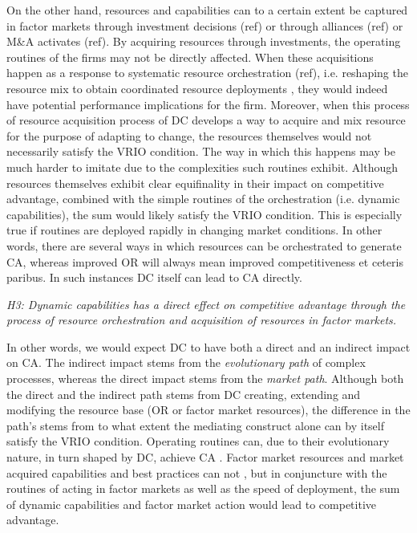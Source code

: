 \documentclass[review,fleqn]{elsarticle}\usepackage[]{graphicx}\usepackage[]{color}
\begin{document}
On the other hand, resources and capabilities can to a certain extent be captured in
factor markets through investment decisions (ref) or through alliances (ref) or M\&A
activates (ref). By acquiring resources through investments, the operating routines of the
firms may not be directly affected. When these acquisitions happen as a response to
systematic resource orchestration (ref), i.e. reshaping the resource mix to obtain
coordinated resource deployments \citep{Kor2005,Pan2006}, they would indeed have potential
performance implications for the firm. Moreover, when this process of resource acquisition
process of DC develops a way to acquire and mix resource for the purpose of adapting to
change, the resources themselves would not necessarily satisfy the VRIO condition. The way
in which this happens may be much harder to imitate due to the complexities such routines
exhibit. Although resources themselves exhibit clear equifinality in their impact on
competitive advantage, combined with the simple routines of the orchestration
(i.e. dynamic capabilities), the sum would likely satisfy the VRIO condition. This is
especially true if routines are deployed rapidly in changing market conditions. In other
words, there are several ways in which resources can be orchestrated to generate CA,
whereas improved OR will always mean improved competitiveness et ceteris paribus. In such
instances DC itself can lead to CA directly.

\emph{H3: Dynamic capabilities has a direct effect on competitive advantage through the
  process of resource orchestration and acquisition of resources in factor markets.}

In other words, we would expect DC to have both a direct and an indirect impact on CA. The
indirect impact stems from the \emph{evolutionary path} of complex processes, whereas the
direct impact stems from the \emph{market path}.  Although both the direct and the
indirect path stems from DC creating, extending and modifying the resource base (OR or
factor market resources), the difference in the path’s stems from to what extent the
mediating construct alone can by itself satisfy the VRIO condition. Operating routines
can, due to their evolutionary nature, in turn shaped by DC, achieve CA
\citep{Collis1994,Winter2003}. Factor market resources and market acquired capabilities
and best practices can not \citep{Eisenhardt2000,Peteraf2013}, but in conjuncture with the
routines of acting in factor markets as well as the speed of deployment, the sum of
dynamic capabilities and factor market action would lead to competitive advantage.
\end{document}
